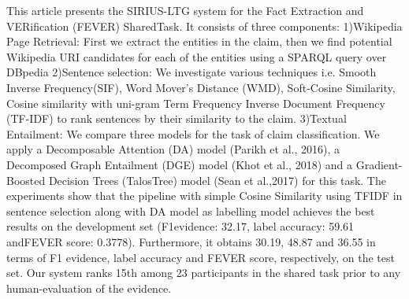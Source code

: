 This article  presents   the SIRIUS-LTG system  for  the  Fact Extraction and VERification (FEVER) SharedTask. It  consists  of  three  components:   1)Wikipedia  Page  Retrieval:   First  we  extract the entities in the claim,  then we find potential Wikipedia URI candidates for each of the entities  using  a  SPARQL  query  over  DBpedia 2)Sentence selection: We investigate various techniques i.e. Smooth Inverse Frequency(SIF), Word Mover's Distance (WMD), Soft-Cosine Similarity, Cosine similarity with uni-gram Term Frequency Inverse Document Frequency  (TF-IDF)  to  rank  sentences  by  their similarity to the claim.  3)Textual Entailment: We compare three models for the task of claim classification.  We apply a Decomposable Attention  (DA)  model  (Parikh  et  al.,  2016),  a Decomposed Graph Entailment (DGE) model (Khot et al., 2018) and a Gradient-Boosted Decision  Trees  (TalosTree)  model  (Sean  et  al.,2017)  for  this  task.    The  experiments  show that the pipeline with simple Cosine Similarity  using  TFIDF  in  sentence  selection  along with  DA  model  as  labelling model  achieves the  best  results  on  the  development  set  (F1evidence:   32.17,  label  accuracy:   59.61  andFEVER  score:  0.3778).   Furthermore,  it  obtains 30.19, 48.87 and 36.55 in terms of F1 evidence, label accuracy and FEVER score, respectively, on the test set. Our system ranks 15th among 23 participants in the shared task prior to any human-evaluation of the evidence.
